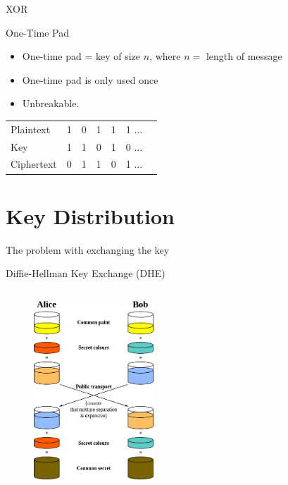 \documentclass{beamer}
\begin{document}
	\begin{frame}{XOR} %

	\end{frame}

	\begin{frame}{One-Time Pad} %
		\begin{itemize}
			\item One-time pad = key of size $n$, where $n=$ length of message

			\item One-time pad is only used once

			\item Unbreakable.

		\end{itemize}

		\begin{table}
			\begin{tabular}{l | c c c c c c }
				Plaintext  & 1 & 0 & 1 & 1 & 1 $\hdots$ \\
				Key        & 1 & 1 & 0 & 1 & 0 $\hdots$ \\
				Ciphertext & 0 & 1 & 1 & 0 & 1 $\hdots$ \\
			\end{tabular}
		\end{table}
	\end{frame}

	\section{Key Distribution}
	\begin{frame}{The problem with exchanging the key} %

	\end{frame}

	\begin{frame}{Diffie-Hellman Key Exchange (DHE)} %
		\begin{columns}
			\begin{column}{\textwidth}
				\begin{figure}
					\includegraphics[width=0.4\textwidth]{images/diffie-hellman}
				\end{figure}
			\end{column}
		\end{columns}
	\end{frame}
\end{document}
